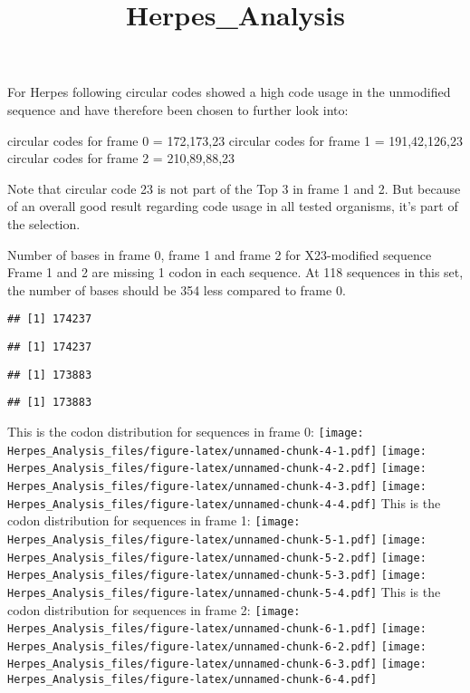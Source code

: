 \documentclass[
]{article}
\title{Herpes\_Analysis}
\author{}
\date{\vspace{-2.5em}}
\begin{document}
\maketitle

For Herpes following circular codes showed a high code usage in the
unmodified sequence and have therefore been chosen to further look into:

circular codes for frame 0 = 172,173,23 circular codes for frame 1 =
191,42,126,23 circular codes for frame 2 = 210,89,88,23

Note that circular code 23 is not part of the Top 3 in frame 1 and 2.
But because of an overall good result regarding code usage in all tested
organisms, it's part of the selection.

Number of bases in frame 0, frame 1 and frame 2 for X23-modified
sequence Frame 1 and 2 are missing 1 codon in each sequence. At 118
sequences in this set, the number of bases should be 354 less compared
to frame 0.

\begin{verbatim}
## [1] 174237
\end{verbatim}

\begin{verbatim}
## [1] 174237
\end{verbatim}

\begin{verbatim}
## [1] 173883
\end{verbatim}

\begin{verbatim}
## [1] 173883
\end{verbatim}

This is the codon distribution for sequences in frame 0:
\texttt{[image: Herpes\_Analysis\_files/figure-latex/unnamed-chunk-4-1.pdf]}
\texttt{[image: Herpes\_Analysis\_files/figure-latex/unnamed-chunk-4-2.pdf]}
\texttt{[image: Herpes\_Analysis\_files/figure-latex/unnamed-chunk-4-3.pdf]}
\texttt{[image: Herpes\_Analysis\_files/figure-latex/unnamed-chunk-4-4.pdf]}
This is the codon distribution for sequences in frame 1:
\texttt{[image: Herpes\_Analysis\_files/figure-latex/unnamed-chunk-5-1.pdf]}
\texttt{[image: Herpes\_Analysis\_files/figure-latex/unnamed-chunk-5-2.pdf]}
\texttt{[image: Herpes\_Analysis\_files/figure-latex/unnamed-chunk-5-3.pdf]}
\texttt{[image: Herpes\_Analysis\_files/figure-latex/unnamed-chunk-5-4.pdf]}
This is the codon distribution for sequences in frame 2:
\texttt{[image: Herpes\_Analysis\_files/figure-latex/unnamed-chunk-6-1.pdf]}
\texttt{[image: Herpes\_Analysis\_files/figure-latex/unnamed-chunk-6-2.pdf]}
\texttt{[image: Herpes\_Analysis\_files/figure-latex/unnamed-chunk-6-3.pdf]}
\texttt{[image: Herpes\_Analysis\_files/figure-latex/unnamed-chunk-6-4.pdf]}
\end{document}
